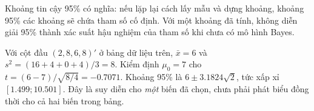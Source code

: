 Khoảng tin cậy 95\% có nghĩa: nếu lặp lại cách lấy mẫu và dựng khoảng,
khoảng 95\% các khoảng sẽ chứa tham số cố định. Với một khoảng đã tính,
không diễn giải 95\% thành xác suất hậu nghiệm của tham số khi chưa có mô hình Bayes.

\begin{example}
Với cột đầu $(2,8,6,8)'$ ở bảng dữ liệu trên,
$\bar x=6$ và $s^2=(16+4+0+4)/3=8$.
Kiểm định $\mu_0=7$ cho $t=(6-7)/\sqrt{8/4}=-0.7071$.
Khoảng 95\% là $6\pm3.1824\sqrt2$, tức xấp xỉ $[1.499;10.501]$.
Đây là suy diễn cho \emph{một} biến đã chọn, chưa phải phát biểu đồng thời
cho cả hai biến trong bảng.
\end{example}

